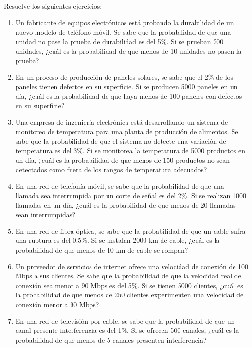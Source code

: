 \begin{Ejer}
Resuelve los siguientes ejercicios:
\begin{enumerate}

    \item Un fabricante de equipos electrónicos está probando la durabilidad de un nuevo modelo de teléfono móvil. Se sabe que la probabilidad de que una unidad no pase la prueba de durabilidad es del 5\%. Si se prueban 200 unidades, ¿cuál es la probabilidad de que menos de 10 unidades no pasen la prueba?

    \item En un proceso de producción de paneles solares, se sabe que el 2\% de los paneles tienen defectos en su superficie. Si se producen 5000 paneles en un día, ¿cuál es la probabilidad de que haya menos de 100 paneles con defectos en su superficie?

    \item Una empresa de ingeniería electrónica está desarrollando un sistema de monitoreo de temperatura para una planta de producción de alimentos. Se sabe que la probabilidad de que el sistema no detecte una variación de temperatura es del 3\%. Si se monitorea la temperatura de 5000 productos en un día, ¿cuál es la probabilidad de que menos de 150 productos no sean detectados como fuera de los rangos de temperatura adecuados?

    \item En una red de telefonía móvil, se sabe que la probabilidad de que una llamada sea interrumpida por un corte de señal es del 2\%. Si se realizan 1000 llamadas en un día, ¿cuál es la probabilidad de que menos de 20 llamadas sean interrumpidas?

    \item En una red de fibra óptica, se sabe que la probabilidad de que un cable sufra una ruptura es del 0.5\%. Si se instalan 2000 km de cable, ¿cuál es la probabilidad de que menos de 10 km de cable se rompan?

    \item Un proveedor de servicios de internet ofrece una velocidad de conexión de 100 Mbps a sus clientes. Se sabe que la probabilidad de que la velocidad real de conexión sea menor a 90 Mbps es del 5\%. Si se tienen 5000 clientes, ¿cuál es la probabilidad de que menos de 250 clientes experimenten una velocidad de conexión menor a 90 Mbps?

    \item En una red de televisión por cable, se sabe que la probabilidad de que un canal presente interferencia es del 1\%. Si se ofrecen 500 canales, ¿cuál es la probabilidad de que menos de 5 canales presenten interferencia?


\end{enumerate}
\end{Ejer}
